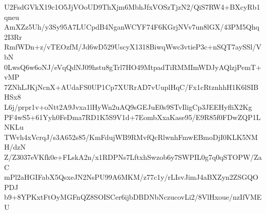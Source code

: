 U2FsdGVkX19c1O5JjVOoUD9ThXjm6MbhJfxVOSzTjzN2/QiS7RW4+BXcyRb1qneu
AmXZz5Uh/y3Sy95A7LUCpdB4NganWCYF74F6KGrjNVv7un8lGX/43PM5Qhq2I3Rr
RmfWDn+z/vTEOzfM/Jd6wD529UscyX1318BiwqWwc3vtieP3c+nSQT7aySSl/VbN
0LwsQ6w6oNJ/eVqQdNJ09hstu8gTrl7HO49MtpadTiRMMImWDJyAQlzjPemT+vMP
7ZNhLJKjNcnX+AUdaFS0UP1Cp7XURrAD7vUuplHqC/Fx1cRtznhhH1K6lSIBHSx8
L6j/prpr1v+oNtt2A9Jvxa1lHyWn2uAQ9sGEJuE0s9STvIligCp3JEEHyfliX2Kg
PF4wS5+61Yyh0FeDma7RD1K5S9V1d+7EombXxaKase95/E9R85f0FDwZQP1LNKLu
TWvh4xVcrqJ/s3A652s85/KmFdujWB9RMvfQcRlwnhFmwEBmoDjI0KLK5NMH/dzN
Z/Z3037eVKfk0e+FLskA2n/x1RDPNs7LftxhSwzob6y7SWPIL0g7q0qSTOPW/ZaC
mPl2aHGIFabX5QsxeJN2NsPU99A6MKM/z77c1y/rLIsvJimJ4aBXZyn2ZSGQOPDJ
b9+8YPKxtFtOyMGFnQZ8SOISCer6ijbDBDNbNczucovLi2/8VlHxoue/nzIfVMEU
